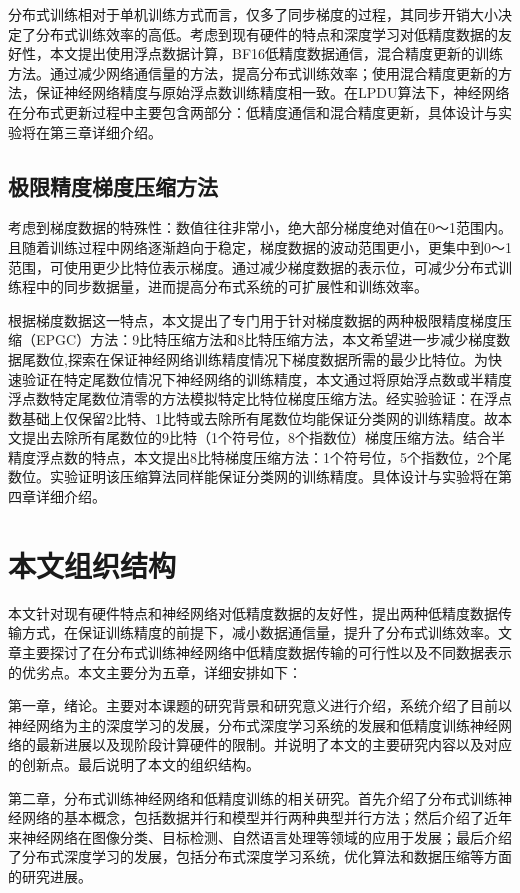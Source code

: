 分布式训练相对于单机训练方式而言，仅多了同步梯度的过程，其同步开销大小决定了分布式训练效率的高低。考虑到现有硬件的特点和深度学习对低精度数据的友好性，本文提出使用浮点数据计算，BF16低精度数据通信，混合精度更新的训练方法。通过减少网络通信量的方法，提高分布式训练效率；使用混合精度更新的方法，保证神经网络精度与原始浮点数训练精度相一致。在LPDU算法下，神经网络在分布式更新过程中主要包含两部分：低精度通信和混合精度更新，具体设计与实验将在第三章详细介绍。

\subsection{极限精度梯度压缩方法}
考虑到梯度数据的特殊性：数值往往非常小，绝大部分梯度绝对值在0～1范围内。且随着训练过程中网络逐渐趋向于稳定，梯度数据的波动范围更小，更集中到0～1范围，可使用更少比特位表示梯度。通过减少梯度数据的表示位，可减少分布式训练程中的同步数据量，进而提高分布式系统的可扩展性和训练效率。

根据梯度数据这一特点，本文提出了专门用于针对梯度数据的两种极限精度梯度压缩（EPGC）方法：9比特压缩方法和8比特压缩方法，本文希望进一步减少梯度数据尾数位,探索在保证神经网络训练精度情况下梯度数据所需的最少比特位。为快速验证在特定尾数位情况下神经网络的训练精度，本文通过将原始浮点数或半精度浮点数特定尾数位清零的方法模拟特定比特位梯度压缩方法。经实验验证：在浮点数基础上仅保留2比特、1比特或去除所有尾数位均能保证分类网的训练精度。故本文提出去除所有尾数位的9比特（1个符号位，8个指数位）梯度压缩方法。结合半精度浮点数的特点，本文提出8比特梯度压缩方法：1个符号位，5个指数位，2个尾数位。实验证明该压缩算法同样能保证分类网的训练精度。具体设计与实验将在第四章详细介绍。

\section{本文组织结构}
本文针对现有硬件特点和神经网络对低精度数据的友好性，提出两种低精度数据传输方式，在保证训练精度的前提下，减小数据通信量，提升了分布式训练效率。文章主要探讨了在分布式训练神经网络中低精度数据传输的可行性以及不同数据表示的优劣点。本文主要分为五章，详细安排如下：

第一章，绪论。主要对本课题的研究背景和研究意义进行介绍，系统介绍了目前以神经网络为主的深度学习的发展，分布式深度学习系统的发展和低精度训练神经网络的最新进展以及现阶段计算硬件的限制。并说明了本文的主要研究内容以及对应的创新点。最后说明了本文的组织结构。

第二章，分布式训练神经网络和低精度训练的相关研究。首先介绍了分布式训练神经网络的基本概念，包括数据并行和模型并行两种典型并行方法；然后介绍了近年来神经网络在图像分类、目标检测、自然语言处理等领域的应用于发展；最后介绍了分布式深度学习的发展，包括分布式深度学习系统，优化算法和数据压缩等方面的研究进展。

